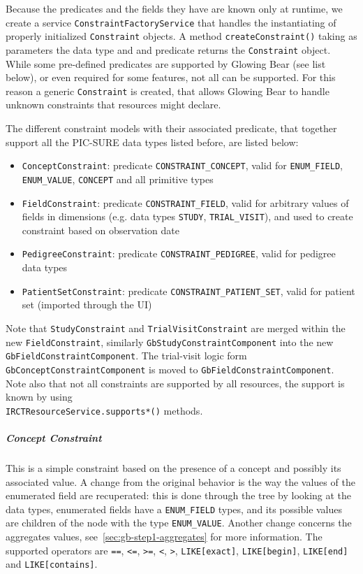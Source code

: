 Because the predicates and the fields they have are known only at runtime, we create a service \verb|ConstraintFactoryService| that handles the instantiating of properly initialized \verb|Constraint| objects.
A method \verb|createConstraint()| taking as parameters the data type and and predicate returns the \verb|Constraint| object.
While some pre-defined predicates are supported by Glowing Bear (see list below), or even required for some features, not all can be supported. 
For this reason a generic \verb|Constraint| is created, that allows Glowing Bear to handle unknown constraints that resources might declare.

The different constraint models with their associated predicate, that together support all the PIC-SURE data types listed before, are listed below:
\begin{itemize}
    \item \verb|ConceptConstraint|: predicate \verb|CONSTRAINT_CONCEPT|, valid for \verb|ENUM_FIELD|, \verb|ENUM_VALUE|, \verb|CONCEPT| and all primitive types 
    \item \verb|FieldConstraint|: predicate \verb|CONSTRAINT_FIELD|, valid for arbitrary values of fields in dimensions (e.g. data types \verb|STUDY|, \verb|TRIAL_VISIT|), and used to create constraint based on observation date
    \item \verb|PedigreeConstraint|: predicate \verb|CONSTRAINT_PEDIGREE|, valid for pedigree data types
    \item \verb|PatientSetConstraint|: predicate \verb|CONSTRAINT_PATIENT_SET|, valid for patient set (imported through the UI)
\end{itemize}

Note that \verb|StudyConstraint| and \verb|TrialVisitConstraint| are merged within the new \verb|FieldConstraint|, similarly \verb|GbStudyConstraintComponent| into the new \verb|GbFieldConstraintComponent|.
The trial-visit logic form \verb|GbConceptConstraintComponent| is moved to \verb|GbFieldConstraintComponent|.
Note also that not all constraints are supported by all resources, the support is known by using \\
\verb|IRCTResourceService.supports*()| methods. 

\subparagraph{Concept Constraint}
This is a simple constraint based on the presence of a concept and possibly its associated value.
A change from the original behavior is the way the values of the enumerated field are recuperated: this is done through the tree by looking at the data types, enumerated fields have a \verb|ENUM_FIELD| types, and its possible values are children of the node with the type \verb|ENUM_VALUE|.
Another change concerns the aggregates values, see~\ref{sec:gb-step1-aggregates} for more information.
The supported operators are \verb|==|, \verb|<=|, \verb|>=|, \verb|<|, \verb|>|, \verb|LIKE[exact]|, \verb|LIKE[begin]|, \verb|LIKE[end]| and \verb|LIKE[contains]|.

